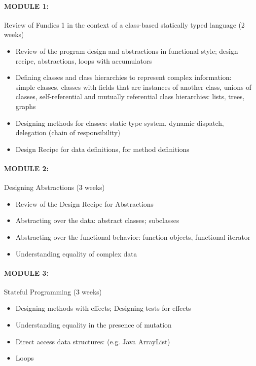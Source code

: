 \documentclass[11pt]{article}
\begin{document}
\paragraph{MODULE 1:}
%
Review of Fundies 1 in the context of a class-based statically typed language (2 weeks)
%
\begin{itemize}
\item Review of the program design and abstractions in functional style;
  design recipe, abstractions, loops with accumulators
\item Defining classes and class hierarchies to represent complex information:
  simple classes, classes with fields that are instances of another class, 
  unions of classes, self-referential and mutually referential class   
  hierarchies: lists, trees, graphs
\item Designing methods for classes: static type system, dynamic dispatch,
  delegation (chain of responsibility)
\item Design Recipe for data definitions, for method definitions
\end{itemize}

\paragraph{MODULE 2:}
%
Designing Abstractions (3 weeks)
%
\begin{itemize}
\item Review of the Design Recipe for Abstractions
\item Abstracting over the data: abstract classes; subclasses
\item Abstracting over the functional behavior: function objects, functional iterator
\item Understanding equality of complex data
\end{itemize}

\paragraph{MODULE 3:}
%
Stateful Programming (3 weeks)
%
\begin{itemize}
\item Designing methods with effects; Designing tests for effects
\item Understanding equality in the presence of mutation
\item Direct access data structures: (e.g. Java ArrayList)
\item Loops
\end{itemize}
\end{document}
